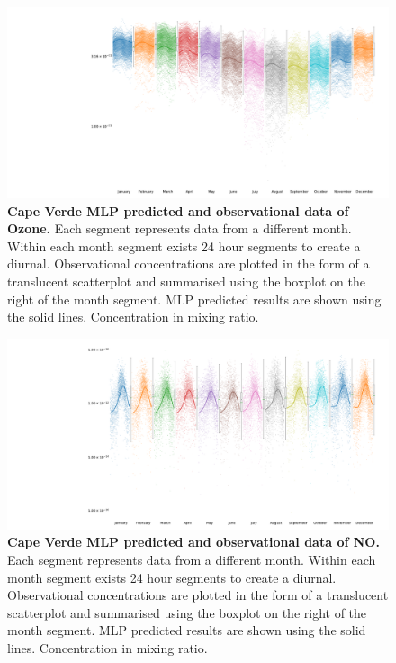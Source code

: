 \begin{figure}[H]
     \centering
         \includegraphics[width=.90\textheight,angle =90,trim={8cm 0 0 0}]{figures_c3/mlpregressor/CVNOX_CapeVerde/O3.pdf}
        \caption{\textbf{Cape Verde MLP predicted and observational data of Ozone.} Each segment represents data from a different month. Within each month segment exists 24 hour segments to create a diurnal. Observational concentrations are plotted in the form of a translucent scatterplot and summarised using the boxplot on the right of the month segment. MLP predicted results are shown using the solid lines. Concentration in mixing ratio.}
        \label{fig:mlpo3}
\end{figure}

\begin{figure}[H]
     \centering
         \includegraphics[width=.90\textheight,angle =90,trim={8cm 0 0 0}]{figures_c3/mlpregressor/CVNOX_CapeVerde/NO.pdf}
        \caption{\textbf{Cape Verde MLP predicted and observational data of NO.} Each segment represents data from a different month. Within each month segment exists 24 hour segments to create a diurnal. Observational concentrations are plotted in the form of a translucent scatterplot and summarised using the boxplot on the right of the month segment. MLP predicted results are shown using the solid lines. Concentration in mixing ratio.}
        \label{fig:mlpno}
\end{figure}

